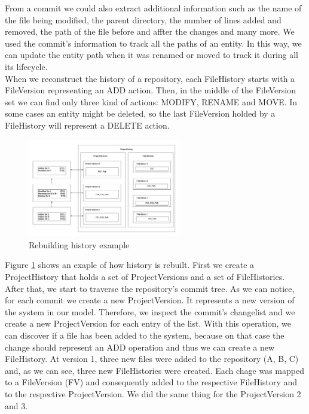 From a commit we could also extract additional information such as the name of the file being modified, the parent directory, the number of lines added and removed, the path of the file before and affter the changes and many more.
We used the commit's information to track all the paths of an entity. In this way, we can update the entity path when it was renamed or moved to track it during all its lifecycle. \\
\linebreak
When we reconstruct the history of a repository, each FileHistory starts with a FileVersion representing an ADD action. Then, in the middle of the FileVersion set we can find only three kind of actions: MODIFY, RENAME and MOVE. 
In some cases an entity might be deleted, so the last FileVersion holded by a FileHistory will represent a DELETE action. 

\begin{figure}
    \includegraphics[width=0.6\textwidth]{ApproachExample.png}
    \caption{Rebuilding history example}
    \label{fig:ApproachExample}
\end{figure}

Figure \ref{fig:ApproachExample} shows an exaple of how history is rebuilt. 
First we create a ProjectHistory that holds a set of ProjectVersions and a set of FileHistories. 
After that, we start to traverse the repository's commit tree.
As we can notice, for each commit we create a new ProjectVersion. It represents a new version of the system in our model. 
Therefore, we inspect the commit's changelist and we create a new ProjectVersion for each entry of the list.
With this operation, we can discover if a file has been added to the system, because on that case the change should represent an ADD operation and thus we can create a new FileHistory. 
At version 1, three new files were added to the repository (A, B, C) and, as we can see, three new FileHistories were created.
Each chage was mapped to a FileVersion (FV) and consequently added to the respective FileHistory and to the respective ProjectVersion. 
We did the same thing for the ProjectVersion 2 and 3. 

